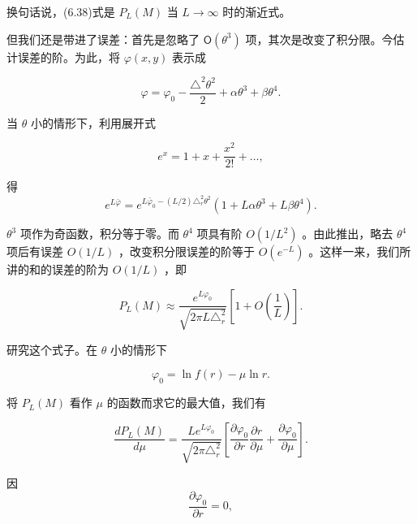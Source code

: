 换句话说，(6.38)式是 $P_{L}(M)$ 当 $L \to \infty$ 时的渐近式。

但我们还是带进了误差：首先是忽略了 $\mathsf{O}(\theta^3)$ 项，其次是改变了积分限。今估计误差的阶。为此，将 $\varphi(x, y)$ 表示成

\begin{equation*}
\varphi = \varphi_ {0} - \frac {\triangle^ {2} \theta^ {2}}{2} + \alpha \theta^ {3} + \beta \theta^ {4}.\tag{6.39}
\end{equation*}

当 $\theta$ 小的情形下，利用展开式

\begin{equation*}
e ^ {x} = 1 + x + \frac {x ^ {2}}{2 !} + \dots ,
\end{equation*}

得
\begin{equation*}
e ^ {L \bar {\varphi}} = e ^ {L \bar {\varphi} _ {0} - (L / 2) \triangle_ {r} ^ {2} \theta^ {2}} (1 + L \alpha \theta^ {3} + L \beta \theta^ {4}).\tag{6.40}
\end{equation*}

$\theta^3$ 项作为奇函数，积分等于零。而 $\theta^4$ 项具有阶 $O(1 / L^2)$ 。由此推出，略去 $\theta^4$ 项后有误差 $O(1 / L)$ ，改变积分限误差的阶等于 $O(e^{-L})$ 。这样一来，我们所讲的和的误差的阶为 $O(1 / L)$ ，即

\begin{equation*}
P _ {L} (M) \approx \frac {e ^ {L \varphi_ {0}}}{\sqrt {2 \pi L \triangle_ {r} ^ {2}}} \left[ 1 + O \left(\frac {1}{L}\right) \right].\tag{6.41}
\end{equation*}

研究这个式子。在 $\theta$ 小的情形下

\begin{equation*}
\varphi_ {0} = \ln f (r) - \mu \ln r.\tag{6.41a}
\end{equation*}

将 $P_{L}(M)$ 看作 $\mu$ 的函数而求它的最大值，我们有

\begin{equation*}
\frac {d P _ {L} (M)}{d \mu} = \frac {L e ^ {L \varphi_ {0}}}{\sqrt {2 \pi \triangle_ {r} ^ {2}}} \left[ \frac {\partial \varphi_ {0}}{\partial r} \frac {\partial r}{\partial \mu} + \frac {\partial \varphi_ {0}}{\partial \mu} \right].\tag{6.42}
\end{equation*}

因
\begin{equation*}
\frac {\partial \varphi_ {0}}{\partial r} = 0,
\end{equation*}

